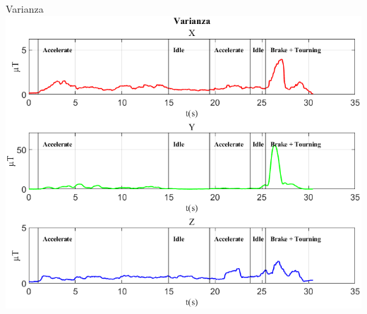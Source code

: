 \documentclass[beamer]{standalone}
\begin{document}
	
	\begin{frame}{{Varianza}}
		\centering\includegraphics[height=.8\textheight]{figure/Mag/Varianza}
	\end{frame}
	
	
	

	
	
	
\end{document}
